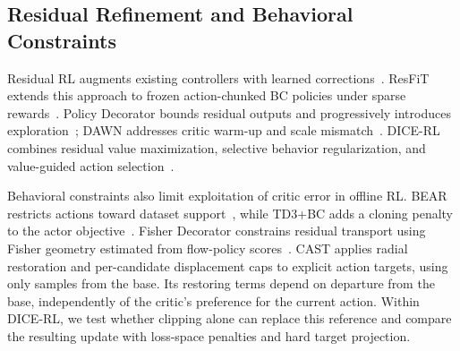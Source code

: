 \subsection{Residual Refinement and Behavioral Constraints}

Residual RL augments existing controllers with learned
corrections~\cite{johannink2019residual}. ResFiT extends this approach to
frozen action-chunked BC policies under sparse rewards~\cite{ankile2025resfit}.
Policy Decorator bounds residual outputs and progressively introduces
exploration~\cite{yuan2025policydecorator}; DAWN addresses critic warm-up
and scale mismatch~\cite{dawn2026}. DICE-RL combines residual value
maximization, selective behavior regularization, and value-guided action
selection~\cite{dicerl2026}.

Behavioral constraints also limit exploitation of critic error in offline
RL. BEAR restricts actions toward dataset support~\cite{kumar2019bear},
while TD3+BC adds a cloning penalty to the actor
objective~\cite{fujimoto2021td3bc}. Fisher Decorator constrains residual
transport using Fisher geometry estimated from flow-policy
scores~\cite{cheng2026fisherdecorator}. CAST applies radial restoration and
per-candidate displacement caps to explicit action targets, using only
samples from the base. Its restoring terms depend on departure from the base, independently of the critic's
preference for the current action. Within DICE-RL, we test whether clipping
alone can replace this reference and compare the resulting update with
loss-space penalties and hard target projection.
